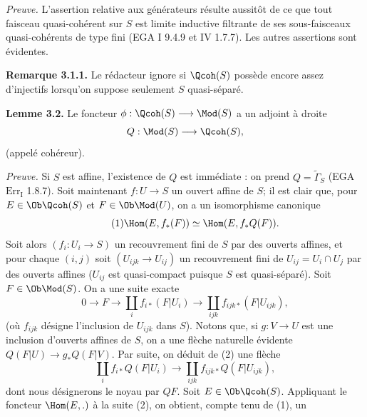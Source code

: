 \emph{Preuve.} L'assertion relative aux générateurs résulte aussitôt de ce que tout faisceau quasi-cohérent sur $S$ est limite inductive filtrante de ses sous-faisceaux quasi-cohérents de type fini (EGA I 9.4.9 et IV 1.7.7). Les autres assertions sont évidentes.

\textbf{Remarque 3.1.1.} Le rédacteur ignore si $\Qcoh(S)$ possède encore assez d'injectifs lorsqu'on suppose seulement $S$ quasi-séparé.

\textbf{Lemme 3.2.} Le foncteur $\phi:\Qcoh(S)\longrightarrow\Mod(S)$ a un adjoint à droite
\[
 Q:\Mod(S)\longrightarrow\Qcoh(S),
\]
(appelé cohéreur).

\emph{Preuve.} Si $S$ est affine, l'existence de $Q$ est immédiate : on prend $Q=\widetilde{\Gamma}_S$ (EGA $\mathrm{Err}_{\mathrm I}$ 1.8.7). Soit maintenant $f:U\longrightarrow S$ un ouvert affine de $S$; il est clair que, pour $E\in\Ob\Qcoh(S)$ et $F\in\Ob\Mod(U)$, on a un isomorphisme canonique
\begin{equation}\tag{1}
 \Hom(E,f_*(F))\simeq \Hom(E,f_*Q(F)).
\end{equation}
Soit alors $(f_i:U_i\longrightarrow S)$ un recouvrement fini de $S$ par des ouverts affines, et pour chaque $(i,j)$ soit $(U_{ijk}\longrightarrow U_{ij})$ un recouvrement fini de $U_{ij}=U_i\cap U_j$ par des ouverts affines ($U_{ij}$ est quasi-compact puisque $S$ est quasi-séparé). Soit $F\in\Ob\Mod(S)$. On a une suite exacte
\begin{equation}\tag{2}
 0\longrightarrow F\longrightarrow \coprod_i f_{i*}(F|U_i)
 \longrightarrow \coprod_{ijk}f_{ijk*}(F|U_{ijk}),
\end{equation}
(où $f_{ijk}$ désigne l'inclusion de $U_{ijk}$ dans $S$). Notons que, si $g:V\longrightarrow U$ est une inclusion d'ouverts affines de $S$, on a une flèche naturelle évidente $Q(F|U)\longrightarrow g_*Q(F|V)$. Par suite, on déduit de (2) une flèche
\begin{equation}\tag{3}
 \coprod_i f_{i*}Q(F|U_i)\longrightarrow
 \coprod_{ijk}f_{ijk*}Q(F|U_{ijk}),
\end{equation}
dont nous désignerons le noyau par $QF$. Soit $E\in\Ob\Qcoh(S)$. Appliquant le foncteur $\Hom(E,.)$ à la suite (2), on obtient, compte tenu de (1), un
